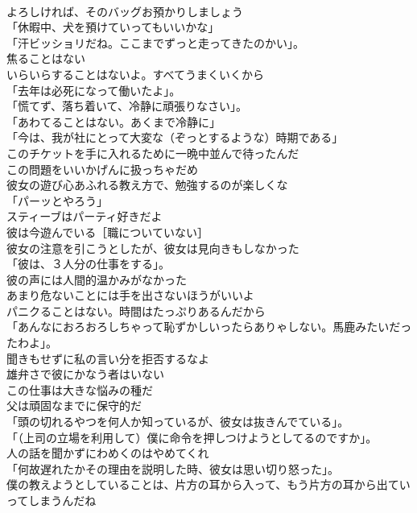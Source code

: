 \documentclass[8pt]{extreport}
\begin{document}
\begin{CJK}{UTF8}{min}
\\	よろしければ、そのバッグお預かりしましょう	
\\	「休暇中、犬を預けていってもいいかな」	
\\	「汗ビッショリだね。ここまでずっと走ってきたのかい」。	
\\	焦ることはない	
\\	いらいらすることはないよ。すべてうまくいくから	
\\	「去年は必死になって働いたよ」。	
\\	「慌てず、落ち着いて、冷静に頑張りなさい」。	
\\	「あわてることはない。あくまで冷静に」	
\\	「今は、我が社にとって大変な（ぞっとするような）時期である」	
\\	このチケットを手に入れるために一晩中並んで待ったんだ	
\\	この問題をいいかげんに扱っちゃだめ	
\\	彼女の遊び心あふれる教え方で、勉強するのが楽しくな	
\\	「パーッとやろう」	
\\	スティーブはパーティ好きだよ	
\\	彼は今遊んでいる［職についていない］	
\\	彼女の注意を引こうとしたが、彼女は見向きもしなかった	
\\	「彼は、３人分の仕事をする」。	
\\	彼の声には人間的温かみがなかった	
\\	あまり危ないことには手を出さないほうがいいよ	
\\	パニクることはない。時間はたっぷりあるんだから	
\\	「あんなにおろおろしちゃって恥ずかしいったらありゃしない。馬鹿みたいだったわよ」。	
\\	聞きもせずに私の言い分を拒否するなよ	
\\	雄弁さで彼にかなう者はいない	
\\	この仕事は大きな悩みの種だ	
\\	父は頑固なまでに保守的だ	
\\	「頭の切れるやつを何人か知っているが、彼女は抜きんでている」。	
\\	「（上司の立場を利用して）僕に命令を押しつけようとしてるのですか」。	
\\	人の話を聞かずにわめくのはやめてくれ	
\\	「何故遅れたかその理由を説明した時、彼女は思い切り怒った」。	
\\	僕の教えようとしていることは、片方の耳から入って、もう片方の耳から出ていってしまうんだね	

\end{CJK}
\end{document}
